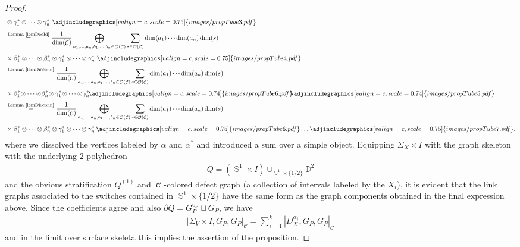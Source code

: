 \documentclass[pdftex]{sigma}
\DeclareMathOperator{\Sp}{\mathbb{S}}
\DeclareMathOperator{\calc}{\mathcal{C}}
\DeclareMathOperator{\calo}{\mathcal{O}}
\numberwithin{equation}{section}
\theoremstyle{definition}
\begin{document}
\begin{proof}
\begin{align*}
 & \otimes \gamma_1^* \otimes \dots \otimes \gamma_n^* \, \,\adjincludegraphics[valign=c, scale = 0.75]{images/propTube3.pdf} \\[1.5mm]
 &\overset{\text{Lemma~\ref{lemDecId}}}{=} \frac{1}{\dim(\calc)} \bigoplus_{a_1, \dots, a_n, b_1, \dots, b_n \in \calo(\calc)} \sum_{s \in \calo(\calc)} \dim(a_1) \cdots \dim(a_n) \dim(s) \\[1.5mm]
 & \times \beta_1^* \otimes \dots \otimes \beta_n^* \otimes \gamma_1^* \otimes \dots \otimes \gamma_n^* \, \,\adjincludegraphics[valign=c, scale = 0.75]{images/propTube4.pdf} \\[1mm]
 &\overset{\text{Lemma~\ref{lemDisconn}}}{=} \frac{1}{\dim(\calc)} \bigoplus_{a_1, \dots, a_n, b_1, \dots, b_n \in \calo(\calc)} \sum_{s \in \calo(\calc)} \dim(a_1) \cdots \dim(a_n) \dim(s) \\[1.5mm]
 & \times \beta_1^*\! \otimes \dots \otimes\! \beta_n^*\! \otimes \gamma_1^*\! \otimes \dots \otimes\! \gamma_n^* \! \adjincludegraphics[valign=c, scale = 0.74]{images/propTube6.pdf}\!\! \adjincludegraphics[valign=c, scale = 0.74]{images/propTube5.pdf} \\[1mm]
 &\overset{\text{Lemma~\ref{lemDisconn}}}{=} \frac{1}{\dim(\calc)} \bigoplus_{a_1, \dots, a_n, b_1, \dots, b_n \in \calo(\calc)} \sum_{s \in \calo(\calc)} \dim(a_1) \cdots \dim(a_n) \dim(s) \\[1.5mm]
 & \times \beta_1^* \otimes \dots \otimes \beta_n^* \otimes \gamma_1^* \otimes \dots \otimes \gamma_n^* \,\adjincludegraphics[valign=c, scale = 0.75]{images/propTube6.pdf} \dots \adjincludegraphics[valign=c, scale = 0.75]{images/propTube7.pdf},
 \end{align*}
 where we dissolved the vertices labeled by $\alpha$ and $\alpha^*$ and introduced a sum over a simple object. Equipping $\Sigma_X \times I$ with the graph skeleton with the underlying 2-polyhedron
 \begin{align*}
 Q = \left(\Sp^1 \times I\right) \cup_{ \Sp^1 \times \{1/2\}} \mathbb{D}^2
 \end{align*}
 and the obvious stratification $Q^{(1)}$ and $\calc$-colored defect graph (a collection of intervals labeled by the $X_i$), it is evident that the link graphs associated to the switches contained in $\Sp^1 \times \{1/2\}$ have the same form as the graph components obtained in the final expression above. Since the coefficients agree and also $\partial Q = G_P^{\mathrm{op}} \sqcup G_P$, we have
 \begin{align*}
 |\Sigma_V \times I, G_{P}, G_P|_{\calc} = \sum_{i = 1}^k|D_X^{\alpha_i}, G_P, G_P|_{\calc}
 \end{align*}
 and in the limit over surface skeleta this implies the assertion of the proposition.
\end{proof}
\end{document}
